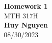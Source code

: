 \begin{titlepage}
    \begin{center}
    {\fontsize{40}{48}\selectfont \bfseries Homework 1} 
    \\\vspace{20pt}
    {\LARGE MTH 317H} \\
    \vspace{20pt}
    \textbf{Huy Nguyen}
    \vspace{8pt}
    \\ 08/30/2023
    \end{center}
\end{titlepage}